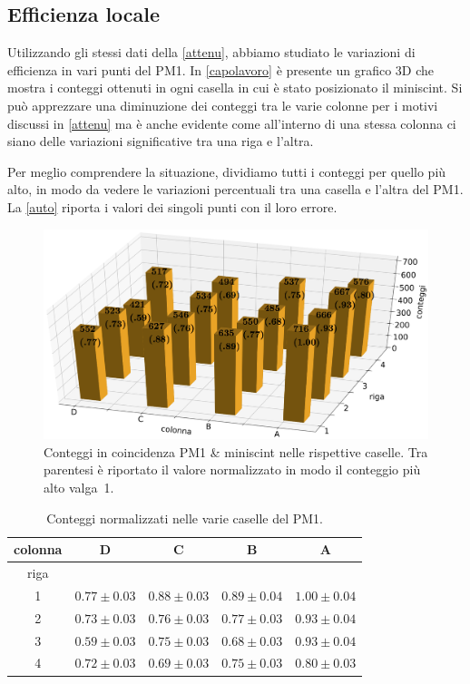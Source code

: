 \subsection{Efficienza locale}
\label{localis}
Utilizzando gli stessi dati della \autoref{attenu}, abbiamo studiato le variazioni di efficienza in vari punti del PM1. In \autoref{capolavoro} è presente un grafico 3D che mostra i conteggi ottenuti in ogni casella in cui è stato posizionato il miniscint. Si può apprezzare una diminuzione dei conteggi tra le varie colonne per i motivi discussi in \autoref{attenu} ma è anche evidente come all'interno di una stessa colonna ci siano delle variazioni significative tra una riga e l'altra.

Per meglio comprendere la situazione, dividiamo tutti i conteggi per quello più alto,
in modo da vedere le variazioni percentuali tra una casella e l'altra del PM1.
La \autoref{auto} riporta i valori dei singoli punti con il loro errore.

\begin{figure}[h]
	\includegraphics[width=\textwidth]{3d_grande}
	\caption{Conteggi in coincidenza PM1 \& miniscint nelle rispettive caselle.
	Tra parentesi è riportato il valore normalizzato in modo il conteggio più alto valga~1.}
	\label{capolavoro}
\end{figure}

\begin{table}[h]
\centering
\begin{tabular}{|c|c|c|c|c|}
\hline
colonna & D & C & B & A \\
 \hline
riga  & & & &  \\
1 & $ 0.77 \pm 0.03 $ & $ 0.88 \pm 0.03 $ & $ 0.89 \pm 0.04 $ & $ 1.00 \pm 0.04 $ \\ 
2 & $ 0.73 \pm 0.03 $ & $ 0.76 \pm 0.03 $ & $ 0.77 \pm 0.03 $ & $ 0.93 \pm 0.04 $ \\ 
3 & $ 0.59 \pm 0.03 $ & $ 0.75 \pm 0.03 $ & $ 0.68 \pm 0.03 $ & $ 0.93 \pm 0.04 $ \\ 
4 & $ 0.72 \pm 0.03 $ & $ 0.69 \pm 0.03 $ & $ 0.75 \pm 0.03 $ & $ 0.80 \pm 0.03 $ \\ 
\hline 
\end{tabular}
\caption{Conteggi normalizzati nelle varie caselle del PM1.}
\label{auto}
\end{table}

